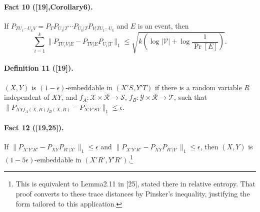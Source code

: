 \paragraph{Fact 10 ([19],Corollary6).} If $P_{TU_1\cdots U_kV}=P_TP_{U_1|T}\cdots P_{U_k|T}P_{V|TU_1\cdots U_k}$ and $E$ is an event, then
\[\sum_{i=1}^k\|P_{TU_iV|E}-P_{TV|E}P_{U_i|T}\|_1\le\sqrt{k\left(\log|\mathcal V|+\log\frac1{\Pr[E]}\right)}.\]
\paragraph{Definition 11 ([19]).} $(X,Y)$ is $(1-\epsilon)$-embeddable in $(X'S,Y'T)$ if there is a random variable $R$ independent of $XY$, and $f_A:\mathcal X\times\mathcal R\to\mathcal S$, $f_B:\mathcal Y\times\mathcal R\to\mathcal T$, such that $\|P_{XYf_A(X,R)f_B(X,R)}-P_{X'Y'ST}\|_1\le\epsilon$.
\paragraph{Fact 12 ([19,25]).} If $\|P_{X'Y'R'}-P_{XY}P_{R'|X'}\|_1\le\epsilon$ and $\|P_{X'Y'R'}-P_{XY}P_{R'|Y'}\|_1\le\epsilon$, then $(X,Y)$ is $(1-5\epsilon)$-embeddable in $(X'R',Y'R')$.\footnote{This is equivalent to Lemma2.11 in [25], stated there in relative entropy. That proof converts to these trace distances by Pinsker's inequality, justifying the form tailored to this application.}

